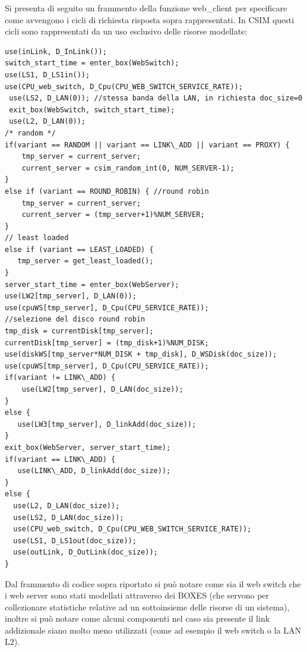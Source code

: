 Si presenta di seguito un frammento della funzione web\_client per specificare come avvengono i cicli di richiesta risposta sopra rappresentati. In CSIM questi cicli sono rappresentati da un uso esclusivo delle risorse modellate: 
\begin{lstlisting}
use(inLink, D_InLink()); 
switch_start_time = enter_box(WebSwitch); 
use(LS1, D_LS1in()); 
use(CPU_web_switch, D_Cpu(CPU_WEB_SWITCH_SERVICE_RATE)); 
 use(LS2, D_LAN(0)); //stessa banda della LAN, in richiesta doc_size=0 
 exit_box(WebSwitch, switch_start_time); 
 use(L2, D_LAN(0)); 
/* random */ 
if(variant == RANDOM || variant == LINK\_ADD || variant == PROXY) { 
    tmp_server = current_server; 
    current_server = csim_random_int(0, NUM_SERVER-1); 
} 
else if (variant == ROUND_ROBIN) { //round robin 
    tmp_server = current_server; 
    current_server = (tmp_server+1)%NUM_SERVER; 
} 
// least loaded 
else if (variant == LEAST_LOADED) { 
   tmp_server = get_least_loaded(); 
} 
server_start_time = enter_box(WebServer); 
use(LW2[tmp_server], D_LAN(0)); 
use(cpuWS[tmp_server], D_Cpu(CPU_SERVICE_RATE)); 
//selezione del disco round robin 
tmp_disk = currentDisk[tmp_server]; 
currentDisk[tmp_server] = (tmp_disk+1)%NUM_DISK; 
use(diskWS[tmp_server*NUM_DISK + tmp_disk], D_WSDisk(doc_size)); 
use(cpuWS[tmp_server], D_Cpu(CPU_SERVICE_RATE)); 
if(variant != LINK\_ADD) { 
    use(LW2[tmp_server], D_LAN(doc_size)); 
} 
else { 
   use(LW3[tmp_server], D_linkAdd(doc_size)); 
}		 
exit_box(WebServer, server_start_time); 
if(variant == LINK\_ADD) { 
   use(LINK\_ADD, D_linkAdd(doc_size)); 
}		  
else { 
  use(L2, D_LAN(doc_size)); 
  use(LS2, D_LAN(doc_size)); 
  use(CPU_web_switch, D_Cpu(CPU_WEB_SWITCH_SERVICE_RATE)); 
  use(LS1, D_LS1out(doc_size)); 
  use(outLink, D_OutLink(doc_size)); 
}	
\end{lstlisting}
Dal frammento di codice sopra riportato si può notare come sia il web switch che i web server sono stati modellati attraverso dei BOXES (che servono per collezionare statistiche relative ad un sottoinsieme delle risorse di un sistema), inoltre si può notare come alcuni componenti nel caso sia presente il link addizionale siano molto meno utilizzati (come ad esempio il web switch o la LAN L2).

